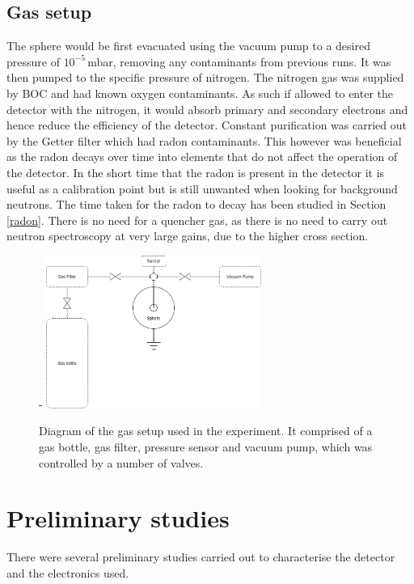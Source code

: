 \documentclass[a4paper]{article}
\begin{document}
\subsection{Gas setup} \label{Gass}
The sphere would be first evacuated using the vacuum pump to a desired pressure of $10^{-5}$\,mbar, removing any contaminants from previous runs. It was then pumped to the specific pressure of nitrogen. The nitrogen gas was supplied by BOC and had known oxygen contaminants. As such if allowed to enter the detector with the nitrogen, it would absorb primary and secondary electrons and hence reduce the efficiency of the detector. Constant purification was carried out by the Getter filter which had radon contaminants. This however was beneficial as the radon decays over time into elements that do not affect the operation of the detector. In the short time that the radon is present in the detector it is useful as a calibration point but is still unwanted when looking for background neutrons. The time taken for the radon to decay has been studied in Section \ref{radon}.
\newline There is no need for a quencher gas, as there is no need to carry out neutron spectroscopy at very large gains, due to the higher cross section.
\begin{figure}[H]-
    \centering
    \includegraphics[height=5cm]{plots/gas.png}
    \caption{Diagram of the gas setup used in the experiment. It comprised of a gas bottle, gas filter, pressure sensor and vacuum pump, which was controlled by a number of valves.}
    \label{fig:gas}
\end{figure}
\section{Preliminary studies}
There were several preliminary studies carried out to characterise the detector and the electronics used.
\end{document}
